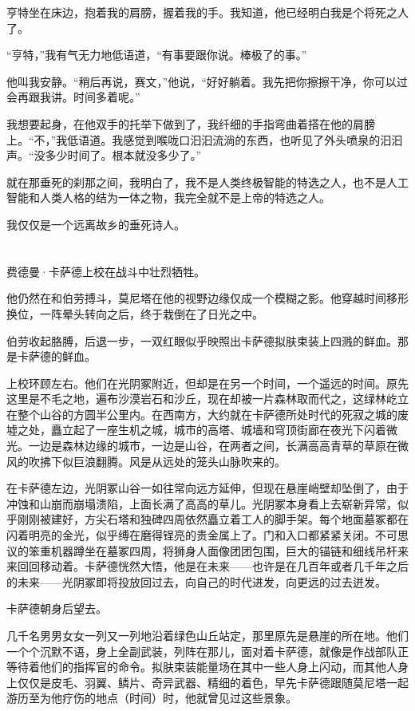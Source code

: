 \documentclass[AutoFakeBold=true]{book}
\begin{document}
亨特坐在床边，抱着我的肩膀，握着我的手。我知道，他已经明白我是个将死之人了。

``亨特，''我有气无力地低语道，``有事要跟你说。棒极了的事。''

他叫我安静。``稍后再说，赛文，''他说，``好好躺着。我先把你擦擦干净，你可以过会再跟我讲。时间多着呢。''

我想要起身，在他双手的托举下做到了，我纤细的手指弯曲着搭在他的肩膀上。``不，''我低语道。我感觉到喉咙口汩汩流淌的东西，也听见了外头喷泉的汩汩声。``没多少时间了。根本就没多少了。''

就在那垂死的刹那之间，我明白了，我不是人类终极智能的特选之人，也不是人工智能和人类人格的结为一体之物，我完全就不是上帝的特选之人。

我仅仅是一个远离故乡的垂死诗人。

\chapter{}

费德曼·卡萨德上校在战斗中壮烈牺牲。

他仍然在和伯劳搏斗，莫尼塔在他的视野边缘仅成一个模糊之影。他穿越时间移形换位，一阵晕头转向之后，终于栽倒在了日光之中。

伯劳收起胳膊，后退一步，一双红眼似乎映照出卡萨德拟肤束装上四溅的鲜血。那是卡萨德的鲜血。

上校环顾左右。他们在光阴冢附近，但却是在另一个时间，一个遥远的时间。原先这里是不毛之地，遍布沙漠岩石和沙丘，现在却被一片森林取而代之，这绿林屹立在整个山谷的方圆半公里内。在西南方，大约就在卡萨德所处时代的死寂之城的废墟之处，矗立起了一座生机之城，城市的高塔、城墙和穹顶街廊在夜光下闪着微光。一边是森林边缘的城市，一边是山谷，在两者之间，长满高高青草的草原在微风的吹拂下似巨浪翻腾。风是从远处的笼头山脉吹来的。

在卡萨德左边，光阴冢山谷一如往常向远方延伸，但现在悬崖峭壁却坠倒了，由于冲蚀和山崩而崩塌溃陷，上面长满了高高的草儿。光阴冢本身看上去崭新异常，似乎刚刚被建好，方尖石塔和独碑四周依然矗立着工人的脚手架。每个地面墓冢都在闪着明亮的金光，似乎缚在磨得锃亮的贵金属上了。门和入口都紧紧关闭。不可思议的笨重机器蹲坐在墓冢四周，将狮身人面像团团包围，巨大的锚链和细线吊杆来来回回移动着。卡萨德恍然大悟，他是在未来——也许是在几百年或者几千年之后的未来——光阴冢即将投放回过去，向自己的时代进发，向更远的过去迸发。

卡萨德朝身后望去。

几千名男男女女一列又一列地沿着绿色山丘站定，那里原先是悬崖的所在地。他们一个个沉默不语，身上全副武装，列阵在那儿，面对着卡萨德，就像是作战部队正等待着他们的指挥官的命令。拟肤束装能量场在其中一些人身上闪动，而其他人身上仅仅是皮毛、羽翼、鳞片、奇异武器、精细的着色，早先卡萨德跟随莫尼塔一起游历至为他疗伤的地点（时间）时，他就曾见过这些景象。
\end{document}

